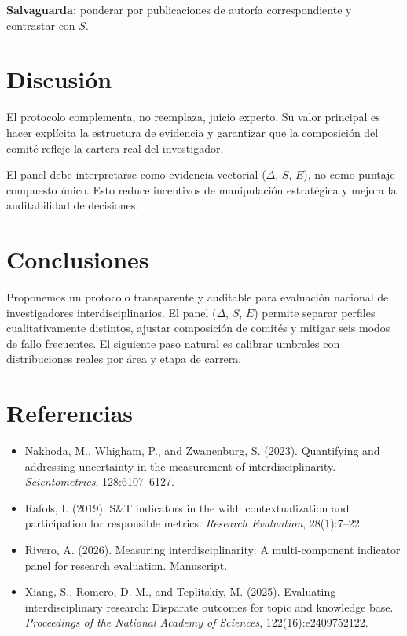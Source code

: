 \documentclass[
]{article}
\providecommand{\tightlist}{%
  \setlength{\itemsep}{0pt}\setlength{\parskip}{0pt}}
\begin{document}
\textbf{Salvaguarda:} ponderar por publicaciones de autoría
correspondiente y contrastar con \(S\).

\hypertarget{discusiuxf3n}{%
\section{Discusión}\label{discusiuxf3n}}

El protocolo complementa, no reemplaza, juicio experto. Su valor
principal es hacer explícita la estructura de evidencia y garantizar que
la composición del comité refleje la cartera real del investigador.

El panel debe interpretarse como evidencia vectorial (\(\Delta\), \(S\),
\(E\)), no como puntaje compuesto único. Esto reduce incentivos de
manipulación estratégica y mejora la auditabilidad de decisiones.

\hypertarget{conclusiones}{%
\section{Conclusiones}\label{conclusiones}}

Proponemos un protocolo transparente y auditable para evaluación
nacional de investigadores interdisciplinarios. El panel (\(\Delta\),
\(S\), \(E\)) permite separar perfiles cualitativamente distintos,
ajustar composición de comités y mitigar seis modos de fallo frecuentes.
El siguiente paso natural es calibrar umbrales con distribuciones reales
por área y etapa de carrera.

\hypertarget{referencias}{%
\section{Referencias}\label{referencias}}

\begin{itemize}
\tightlist
\item
  Nakhoda, M., Whigham, P., and Zwanenburg, S. (2023). Quantifying and
  addressing uncertainty in the measurement of interdisciplinarity.
  \emph{Scientometrics}, 128:6107--6127.
\item
  Rafols, I. (2019). S\&T indicators in the wild: contextualization and
  participation for responsible metrics. \emph{Research Evaluation},
  28(1):7--22.
\item
  Rivero, A. (2026). Measuring interdisciplinarity: A multi-component
  indicator panel for research evaluation. Manuscript.
\item
  Xiang, S., Romero, D. M., and Teplitskiy, M. (2025). Evaluating
  interdisciplinary research: Disparate outcomes for topic and knowledge
  base. \emph{Proceedings of the National Academy of Sciences},
  122(16):e2409752122.
\end{itemize}
\end{document}
